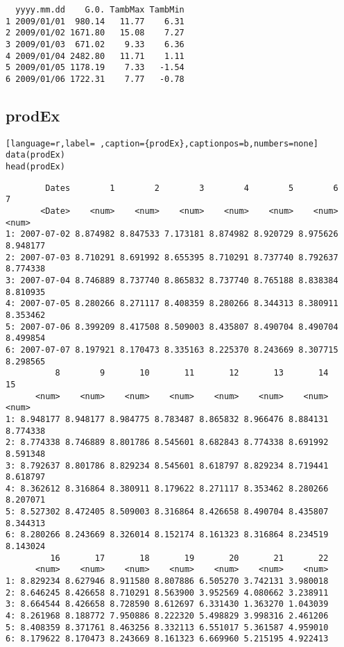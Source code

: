 \begin{verbatim}
  yyyy.mm.dd    G.0. TambMax TambMin
1 2009/01/01  980.14   11.77    6.31
2 2009/01/02 1671.80   15.08    7.27
3 2009/01/03  671.02    9.33    6.36
4 2009/01/04 2482.80   11.71    1.11
5 2009/01/05 1178.19    7.33   -1.54
6 2009/01/06 1722.31    7.77   -0.78
\end{verbatim}

\subsection{prodEx}
\label{sec:orgd7b6ea1}
\label{subsec:prodex}
\begin{lstlisting}[language=r,label= ,caption={prodEx},captionpos=b,numbers=none]
data(prodEx)
head(prodEx)
\end{lstlisting}

\begin{verbatim}
        Dates        1        2        3        4        5        6        7
       <Date>    <num>    <num>    <num>    <num>    <num>    <num>    <num>
1: 2007-07-02 8.874982 8.847533 7.173181 8.874982 8.920729 8.975626 8.948177
2: 2007-07-03 8.710291 8.691992 8.655395 8.710291 8.737740 8.792637 8.774338
3: 2007-07-04 8.746889 8.737740 8.865832 8.737740 8.765188 8.838384 8.810935
4: 2007-07-05 8.280266 8.271117 8.408359 8.280266 8.344313 8.380911 8.353462
5: 2007-07-06 8.399209 8.417508 8.509003 8.435807 8.490704 8.490704 8.499854
6: 2007-07-07 8.197921 8.170473 8.335163 8.225370 8.243669 8.307715 8.298565
          8        9       10       11       12       13       14       15
      <num>    <num>    <num>    <num>    <num>    <num>    <num>    <num>
1: 8.948177 8.948177 8.984775 8.783487 8.865832 8.966476 8.884131 8.774338
2: 8.774338 8.746889 8.801786 8.545601 8.682843 8.774338 8.691992 8.591348
3: 8.792637 8.801786 8.829234 8.545601 8.618797 8.829234 8.719441 8.618797
4: 8.362612 8.316864 8.380911 8.179622 8.271117 8.353462 8.280266 8.207071
5: 8.527302 8.472405 8.509003 8.316864 8.426658 8.490704 8.435807 8.344313
6: 8.280266 8.243669 8.326014 8.152174 8.161323 8.316864 8.234519 8.143024
         16       17       18       19       20       21       22
      <num>    <num>    <num>    <num>    <num>    <num>    <num>
1: 8.829234 8.627946 8.911580 8.807886 6.505270 3.742131 3.980018
2: 8.646245 8.426658 8.710291 8.563900 3.952569 4.080662 3.238911
3: 8.664544 8.426658 8.728590 8.612697 6.331430 1.363270 1.043039
4: 8.261968 8.188772 7.950886 8.222320 5.498829 3.998316 2.461206
5: 8.408359 8.371761 8.463256 8.332113 6.551017 5.361587 4.959010
6: 8.179622 8.170473 8.243669 8.161323 6.669960 5.215195 4.922413
\end{verbatim}

